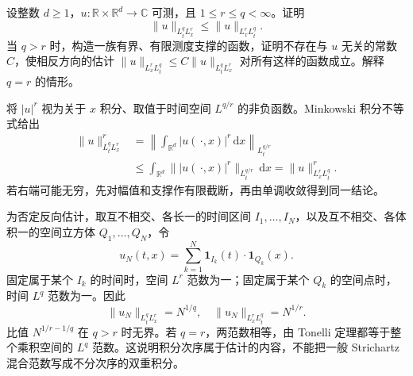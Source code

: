 \begin{exercise}\label{b2:ex:app-E-3}
设整数 \(d\geq1\)，\(u:\mathbb R\times\mathbb R^d\to\mathbb C\) 可测，且 \(1\leq r\leq q<\infty\)。证明
\[
 \|u\|_{L^q_tL^r_x}\leq\|u\|_{L^r_xL^q_t}.
\]
当 \(q>r\) 时，构造一族有界、有限测度支撑的函数，证明不存在与 \(u\) 无关的常数 \(C\)，使相反方向的估计
\(\|u\|_{L^r_xL^q_t}\leq C\|u\|_{L^q_tL^r_x}\) 对所有这样的函数成立。解释 \(q=r\) 的情形。
\end{exercise}
\begin{solution}
将 \(|u|^r\) 视为关于 \(x\) 积分、取值于时间空间 \(L^{q/r}\) 的非负函数。Minkowski 积分不等式给出
\[
 \begin{aligned}
 \|u\|_{L^q_tL^r_x}^r
 &=\left\|\int_{\mathbb R^d}|u(\,\cdot,x)|^r\,\mathrm dx\right\|_{L^{q/r}_t}\\
 &\leq\int_{\mathbb R^d}
       \bigl\||u(\,\cdot,x)|^r\bigr\|_{L^{q/r}_t}\,\mathrm dx
 =\|u\|_{L^r_xL^q_t}^r.
 \end{aligned}
\]
若右端可能无穷，先对幅值和支撑作有限截断，再由单调收敛得到同一结论。

为否定反向估计，取互不相交、各长一的时间区间 \(I_1,\ldots,I_N\)，以及互不相交、各体积一的空间立方体 \(Q_1,\ldots,Q_N\)，令
\[
 u_N(t,x)=\sum_{k=1}^N\mathbf1_{I_k}(t)\cdot\mathbf1_{Q_k}(x).
\]
固定属于某个 \(I_k\) 的时间时，空间 \(L^r\) 范数为一；固定属于某个 \(Q_k\) 的空间点时，时间 \(L^q\) 范数为一。因此
\[
 \|u_N\|_{L^q_tL^r_x}=N^{1/q},\quad
 \|u_N\|_{L^r_xL^q_t}=N^{1/r}.
\]
比值 \(N^{1/r-1/q}\) 在 \(q>r\) 时无界。若 \(q=r\)，两范数相等，由 Tonelli 定理都等于整个乘积空间的 \(L^q\) 范数。这说明积分次序属于估计的内容，不能把一般 Strichartz 混合范数写成不分次序的双重积分。
\end{solution}

